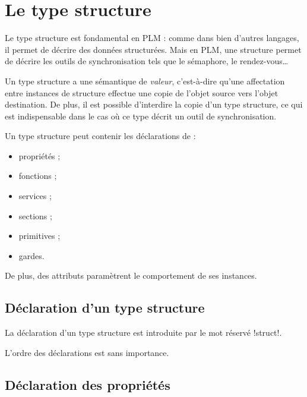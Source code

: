 




\chapter{Le type structure}


Le type structure est fondamental en PLM : comme dans bien d'autres langages, il permet de décrire des données structurées. Mais en PLM, une structure permet de décrire les outils de synchronisation tels que le sémaphore, le rendez-vous…

Un type structure a une sémantique de \emph{valeur}, c'est-à-dire qu'une affectation entre instances de structure effectue une copie de l'objet source vers l'objet destination. De plus, il est possible d'interdire la copie d'un type structure, ce qui est indispensable dans le cas où ce type décrit un outil de synchronisation.

Un type structure peut contenir les déclarations de :
\begin{itemize}
\item propriétés ;
\item fonctions ;
\item services ;
\item sections ;
\item primitives ;
\item gardes.
\end{itemize}

De plus, des attributs paramètrent le comportement de ses instances.

\section{Déclaration d'un type structure}

La déclaration d'un type structure est introduite par le mot réservé \plm!struct!.


L'ordre des déclarations est sans importance.


\section{Déclaration des propriétés}

